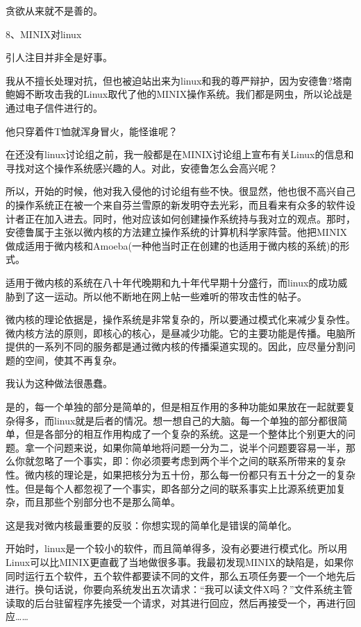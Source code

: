 贪欲从来就不是善的。

 
8、MINIX对linux

引人注目并非全是好事。

我从不擅长处理对抗，但也被迫站出来为linux和我的尊严辩护，因为安德鲁?塔南鲍姆不断攻击我的Linux取代了他的MINIX操作系统。我们都是网虫，所以论战是通过电子信件进行的。

他只穿着件T恤就浑身冒火，能怪谁呢？

在还没有linux讨论组之前，我一般都是在MINIX讨论组上宣布有关Linux的信息和寻找对这个操作系统感兴趣的人。对此，安德鲁怎么会高兴呢？

所以，开始的时候，他对我入侵他的讨论组有些不快。很显然，他也很不高兴自己的操作系统正在被一个来自芬兰雪原的新发明夺去光彩，而且看来有众多的软件设计者正在加入进去。同时，他对应该如何创建操作系统持与我对立的观点。那时，安德鲁属于主张以微内核的方法建立操作系统的计算机科学家阵营。他把MINIX做成适用于微内核和Amoeba(一种他当时正在创建的也适用于微内核的系统)的形式。

适用于微内核的系统在八十年代晚期和九十年代早期十分盛行，而linux的成功威胁到了这一运动。所以他不断地在网上帖一些难听的带攻击性的帖子。

微内核的理论依据是，操作系统是非常复杂的，所以要通过模式化来减少复杂性。微内核方法的原则，即核心的核心，是昼减少功能。它的主要功能是传播。电脑所提供的一系列不同的服务都是通过微内核的传播渠道实现的。因此，应尽量分割问题的空间，使其不再复杂。

我认为这种做法很愚蠢。

是的，每一个单独的部分是简单的，但是相互作用的多种功能如果放在一起就要复杂得多，而linux就是后者的情况。想一想自己的大脑。每一个单独的部分都很简单，但是各部分的相互作用构成了一个复杂的系统。这是一个整体比个别更大的问题。拿一个问题来说，如果你简单地将问题一分为二，说半个问题要容易一半，那么你就忽略了一个事实，即：你必须要考虑到两个半个之间的联系所带来的复杂性。微内核的理论是，如果把核分为五十份，那么每一份都只有五十分之一的复杂性。但是每个人都忽视了一个事实，即各部分之间的联系事实上比源系统更加复杂，而且那些个别部分也不是那么简单。

这是我对微内核最重要的反驳：你想实现的简单化是错误的简单化。

开始时，linux是一个较小的软件，而且简单得多，没有必要进行模式化。所以用Linux可以比MINIX更直截了当地做很多事。我最初发现MINIX的缺陷是，如果你同时运行五个软件，五个软件都要读不同的文件，那么五项任务要一个一个地先后进行。换句话说，你要向系统发出五次请求：“我可以读文件X吗？”文件系统主管读取的后台驻留程序先接受一个请求，对其进行回应，然后再接受一个，再进行回应……

